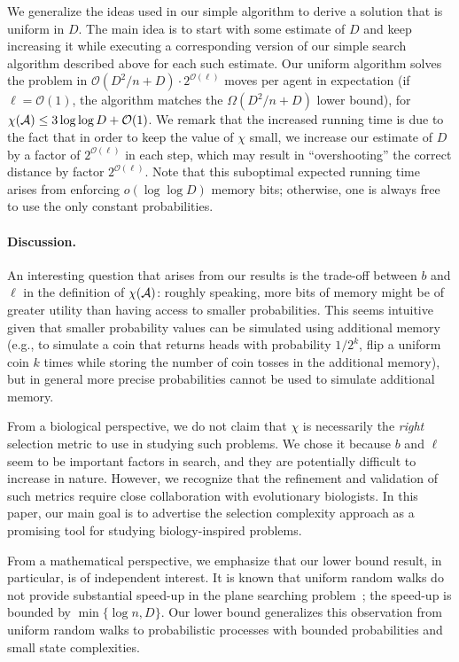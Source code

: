 \documentclass[11pt]{article}
\newcommand{\BO}{\mathcal{O}}
\begin{document}
We generalize the ideas used in our simple algorithm to derive a solution that is uniform in $D$. The main idea is to start with some estimate of $D$ and keep increasing it while executing a corresponding version of our simple search algorithm described above for each such estimate. Our uniform algorithm solves the problem in  $\BO (D^2/n + D) \cdot 2^{\BO(\ell)}$ moves per agent in expectation (if $\ell = \BO(1)$, the algorithm matches the $\Omega(D^2/n + D)$ lower bound), for $\chi({\cal A}) \leq 3 \log\log{D} + \BO(1)$. We remark that the increased running time is due to the fact that in order to keep the value of $\chi$ small, we increase our estimate of $D$ by a factor of $2^{\BO(\ell)}$ in each step, which may result in ``overshooting'' the correct distance by factor $2^{\BO(\ell)}$. Note that this suboptimal expected running time arises from enforcing $o(\log \log D)$ memory bits; otherwise, one is always free to use the only constant probabilities.


  \paragraph{Discussion.}
  An interesting question that arises from our results is the trade-off between $b$ and $\ell$ in the definition of $\chi({\cal A})$: roughly speaking, more bits of memory might be of greater utility than having access to smaller probabilities. This seems intuitive given that smaller probability values can be simulated using additional memory  (e.g., to simulate a coin that returns heads with probability $1/2^k$, flip a uniform coin $k$ times while storing the number of coin tosses in the additional memory), but in general more precise probabilities cannot be used to simulate additional memory.
  
From a biological perspective, we do not claim that $\chi$ is necessarily the {\em right} selection metric to use in studying such problems. We chose it because $b$ and $\ell$ seem to be important factors in search, and  they are potentially difficult to increase in nature. However, we recognize that the refinement and validation of such metrics require close collaboration with evolutionary biologists. In this paper, our main goal is to advertise the selection complexity approach as a promising tool for studying biology-inspired problems.

From a mathematical perspective, we emphasize that our lower bound result, in particular, is of independent interest. It is known that uniform random walks do not provide substantial speed-up in the plane searching problem~\cite{alon08}; the speed-up is bounded by $\min\{\log{n},D\}$. Our lower bound generalizes this observation from uniform random walks to probabilistic processes with bounded probabilities and small state complexities. 
 
\end{document}
